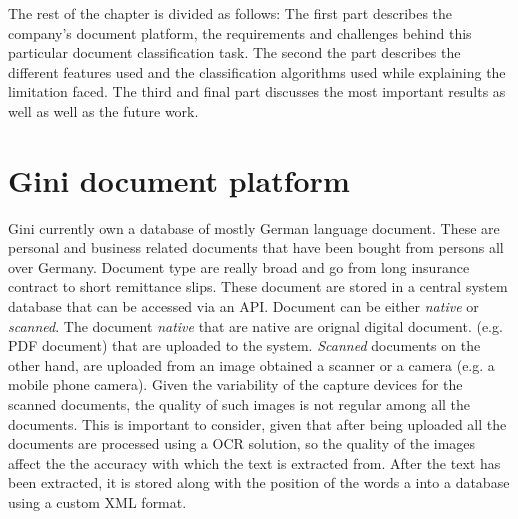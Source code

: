 The rest of the chapter is divided as follows: The first part describes 
the company's  document platform, the requirements and challenges behind this
particular document classification task. The second the part describes the different features
used and the classification algorithms used while explaining the limitation
faced.  The third and final  part discusses the most important results as
well as well as the future work. 

\section{Gini document platform}
\label{sec:gini_doc_platform}

Gini currently own a database of mostly German language document. These
are personal and business related documents that have been bought 
from  persons all over Germany. Document type are really broad and go from
long insurance contract to short remittance slips. These document are stored
in a central system database that can be accessed via an  \textsc{API}.
Document can be either \textit{native} or \textit{scanned}. The document
\textit{native} that are native are orignal digital document. (e.g. PDF document) that
are uploaded to the system. \textit{Scanned} documents on the other hand, are
uploaded from an image obtained a scanner or a camera (e.g. a mobile phone
camera). Given the variability of the capture devices for the scanned
documents, the quality of such images is not regular among all the documents.
This is important to consider, given that after being uploaded all the
documents are processed using a \ac{OCR} solution, so the quality of the
images affect the the accuracy with which the text is extracted from. 
After the text has been extracted, it is stored  along with
the position of the words a into a  database using a custom
\textsc{XML} format. 








